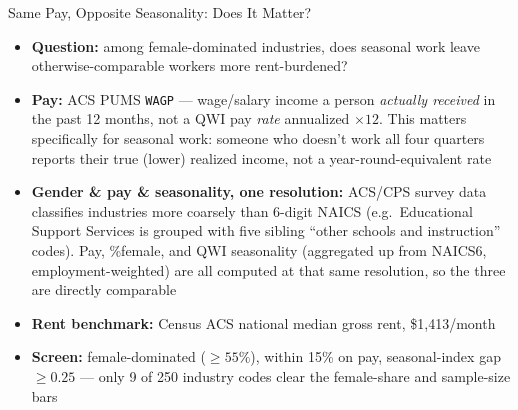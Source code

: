 \documentclass[aspectratio=169]{beamer}
\begin{document}
\begin{frame}{Same Pay, Opposite Seasonality: Does It Matter?}
  \begin{itemize}
    \item \textbf{Question:} among female-dominated industries, does seasonal
          work leave otherwise-comparable workers more rent-burdened?
    \bigskip
    \item \textbf{Pay:} ACS PUMS \texttt{WAGP} --- wage/salary income a person
          \emph{actually received} in the past 12 months, not a QWI pay
          \emph{rate} annualized $\times 12$. This matters specifically for
          seasonal work: someone who doesn't work all four quarters reports
          their true (lower) realized income, not a year-round-equivalent rate
    \item \textbf{Gender \& pay \& seasonality, one resolution:} ACS/CPS survey
          data classifies industries more coarsely than 6-digit NAICS (e.g.\
          Educational Support Services is grouped with five sibling ``other
          schools and instruction'' codes). Pay, \%female, and QWI
          seasonality (aggregated up from NAICS6, employment-weighted) are all
          computed at that same resolution, so the three are directly comparable
    \item \textbf{Rent benchmark:} Census ACS national median gross rent,
          \$1,413/month
    \bigskip
    \item \textbf{Screen:} female-dominated ($\geq 55\%$), within 15\% on pay,
          seasonal-index gap $\geq 0.25$ --- only 9 of 250 industry codes clear
          the female-share and sample-size bars
  \end{itemize}
\end{frame}
\end{document}
